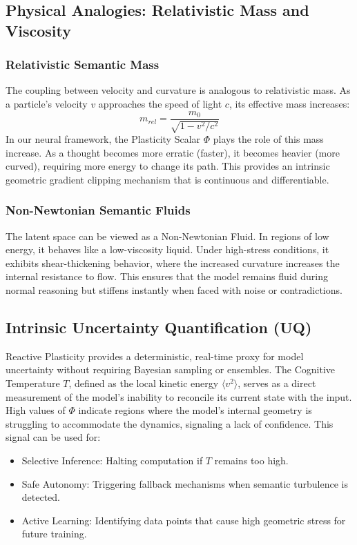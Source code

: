\documentclass{article}
\numberwithin{equation}{section}
\begin{document}
\subsection{Physical Analogies: Relativistic Mass and Viscosity}
\subsubsection{Relativistic Semantic Mass}
The coupling between velocity and curvature is analogous to relativistic mass. As a particle's velocity $v$ approaches the speed of light $c$, its effective mass increases:
\[
m_{rel} = \frac{m_0}{\sqrt{1 - v^2/c^2}}
\]
In our neural framework, the Plasticity Scalar $\Phi$ plays the role of this mass increase. As a thought becomes more erratic (faster), it becomes heavier (more curved), requiring more energy to change its path. This provides an intrinsic geometric gradient clipping mechanism that is continuous and differentiable.

\subsubsection{Non-Newtonian Semantic Fluids}
The latent space can be viewed as a Non-Newtonian Fluid. In regions of low energy, it behaves like a low-viscosity liquid. Under high-stress conditions, it exhibits shear-thickening behavior, where the increased curvature increases the internal resistance to flow. This ensures that the model remains fluid during normal reasoning but stiffens instantly when faced with noise or contradictions.

\subsection{Intrinsic Uncertainty Quantification (UQ)}
Reactive Plasticity provides a deterministic, real-time proxy for model uncertainty without requiring Bayesian sampling or ensembles. The Cognitive Temperature $T$, defined as the local kinetic energy $\langle v^2 \rangle$, serves as a direct measurement of the model's inability to reconcile its current state with the input.
High values of $\Phi$ indicate regions where the model's internal geometry is struggling to accommodate the dynamics, signaling a lack of confidence. This signal can be used for:
\begin{itemize}
\item Selective Inference: Halting computation if $T$ remains too high.
\item Safe Autonomy: Triggering fallback mechanisms when semantic turbulence is detected.
\item Active Learning: Identifying data points that cause high geometric stress for future training.
\end{itemize}
\end{document}
